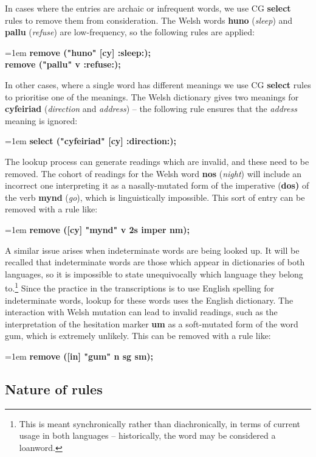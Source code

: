 \documentclass[11pt]{article}
\begin{document}
In cases where the entries are archaic or infrequent words, we use CG \textbf{select} rules to remove them from consideration.  The Welsh words \textbf{huno} (\textit{sleep}) and \textbf{pallu} (\textit{refuse}) are low-frequency, so the following rules are applied:

\noindent
\hangindent=1em
\textbf{remove ("huno" [cy] :sleep:);} \\
\textbf{remove ("pallu" v :refuse:);}

In other cases, where a single word has different meanings we use CG \textbf{select} rules to prioritise one of the meanings.  The Welsh dictionary gives two meanings for \textbf{cyfeiriad} (\textit{direction} and \textit{address}) -- the following rule ensures that the \textit{address} meaning is ignored:

\noindent
\hangindent=1em
\textbf{select ("cyfeiriad" [cy] :direction:);}

The lookup process can generate readings which are invalid, and these need to be removed.  The cohort of readings for the Welsh word \textbf{nos} (\textit{night}) will include an incorrect one interpreting it as a nasally-mutated form of the imperative (\textbf{dos)} of the verb \textbf{mynd} (\textit{go}), which is linguistically impossible.  This sort of entry can be removed with a rule like:

\noindent
\hangindent=1em
\textbf{remove ([cy] "mynd" v 2s imper nm);}

A similar issue arises when indeterminate words are being looked up.  It will be recalled that indeterminate words are those which appear in dictionaries of both languages, so it is impossible to state unequivocally which language they belong to.\footnote{This is meant synchronically rather than diachronically, in terms of current usage in both languages -- historically, the word may be considered a loanword.}  Since the practice in the transcriptions is to use English spelling for indeterminate words, lookup for these words uses the English dictionary.  The interaction with Welsh mutation can lead to invalid readings, such as the interpretation of the hesitation marker \textbf{um} as a soft-mutated form of the word gum, which is extremely unlikely.  This can be removed with a rule like:

\noindent
\hangindent=1em
\textbf{remove ([in] "gum" n sg sm);}


\subsection{Nature of rules}
\label{sec:nature}
\end{document}
